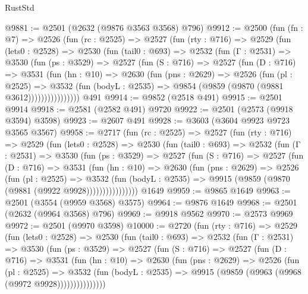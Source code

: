 \begin{lexlean}{RustStd}
\begin{coremodule}
{\begin{coremodule}
{{{{{{{{{{{{{{{{{{{{@9881 := @2501 (@2632 (@9876 @3563 @3568) @796)
@9912 := @2500
    (fun (fn : @7) =>
    @2526
      (fun (rc : @2525) =>
      @2527
        (fun (rty : @716) =>
        @2529
          (fun (lets0 : @2528) =>
          @2530
            (fun (tail0 : @693) =>
            @2532
              (fun (Γ : @2531) =>
              @3530
                (fun (ps : @3529) =>
                @2527
                  (fun (S : @716) =>
                  @2527
                    (fun (D : @716) =>
                    @3531
                      (fun (hn : @10) =>
                      @2630
                        (fun (pns : @2629) =>
                        @2526
                          (fun (pl : @2525) =>
                          @3532
                            (fun (bodyL : @2535) => @9854 (@9859 (@9870 (@9881 @3612))))))))))))))))
    @491
@9914 := @9852 (@2518 @491)
@9915 := @2501 @9914
@9918 := @2581 (@2582 @491) @9720
@9922 := @2501 (@2573 (@9918 @3594) @3598)
@9923 := @2607 @491
@9928 := @3603 (@3604 @9923 @9723 @3565 @3567)
@9958 := @2717
    (fun (rc : @2525) =>
    @2527
      (fun (rty : @716) =>
      @2529
        (fun (lets0 : @2528) =>
        @2530
          (fun (tail0 : @693) =>
          @2532
            (fun (Γ : @2531) =>
            @3530
              (fun (ps : @3529) =>
              @2527
                (fun (S : @716) =>
                @2527
                  (fun (D : @716) =>
                  @3531
                    (fun (hn : @10) =>
                    @2630
                      (fun (pns : @2629) =>
                      @2526
                        (fun (pl : @2525) =>
                        @3532
                          (fun (bodyL : @2535) =>
                          @9915 (@9859 (@9870 (@9881 (@9922 @9928))))))))))))))))
    @1649
@9959 := @9865 @1649
@9963 := @2501 (@3554 (@9959 @3568) @3575)
@9964 := @9876 @1649
@9968 := @2501 (@2632 (@9964 @3568) @796)
@9969 := @9918 @9562
@9970 := @2573 @9969
@9972 := @2501 (@9970 @3598)
@10000 := @2720
    (fun (rty : @716) =>
    @2529
      (fun (lets0 : @2528) =>
      @2530
        (fun (tail0 : @693) =>
        @2532
          (fun (Γ : @2531) =>
          @3530
            (fun (ps : @3529) =>
            @2527
              (fun (S : @716) =>
              @2527
                (fun (D : @716) =>
                @3531
                  (fun (hn : @10) =>
                  @2630
                    (fun (pns : @2629) =>
                    @2526
                      (fun (pl : @2525) =>
                      @3532
                        (fun (bodyL : @2535) =>
                        @9915 (@9859 (@9963 (@9968 (@9972 @9928)))))))))))))))
}}}}}}}}}}}}}}}}}}}}
\end{coremodule}}
\end{coremodule}
\end{lexlean}
